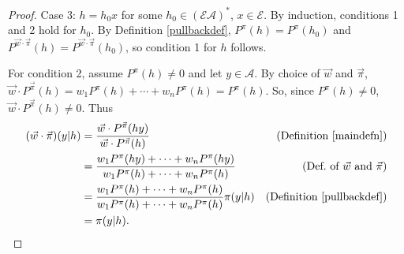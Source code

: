 \documentclass[twoside]{article}
\begin{document}
\begin{proof}
    Case 3: $h=h_0x$ for some $h_0\in (\mathcal E\mathcal A)^*$,
        $x\in\mathcal E$.
        By induction, conditions 1 and 2 hold for $h_0$.
        By Definition \ref{pullbackdef},
        $P^\pi(h)=P^\pi(h_0)$ and
        $P^{\vec w\cdot\vec\pi}(h)=P^{\vec w\cdot\vec\pi}(h_0)$,
        so condition 1 for $h$ follows.

        For condition 2,
        assume $P^\pi(h)\not=0$ and let $y\in\mathcal A$.
        By choice of $\vec w$ and $\vec\pi$,
        $\vec w\cdot{P^{\vec\pi}}(h)=w_1P^\pi(h)+\cdots+w_nP^\pi(h)=P^\pi(h)$.
        So, since $P^\pi(h)\not=0$, $\vec w\cdot{P^{\vec\pi}}(h)\not=0$.
        Thus
        \begin{align*}
            (\vec w\cdot\vec\pi)(y|h)
                &= \frac{\vec w\cdot {P^{\vec\pi}}(hy)}{\vec w\cdot{P^{\vec\pi}}(h)}
                    &\mbox{(Definition \ref{maindefn})}\\
                &= \frac{w_1P^\pi(hy)+\cdots+w_nP^\pi(hy)}
                    {w_1P^\pi(h)+\cdots+w_nP^\pi(h)}
                    &\mbox{(Def.\ of $\vec w$ and $\vec\pi$)}\\
                &= \frac{w_1P^\pi(h)+\cdots+w_nP^\pi(h)}{w_1P^\pi(h)+\cdots+w_nP^\pi(h)}
                    \pi(y|h)
                    &\mbox{(Definition \ref{pullbackdef})}\\
                &= \pi(y|h).
        \end{align*}
\end{proof}
\end{document}
